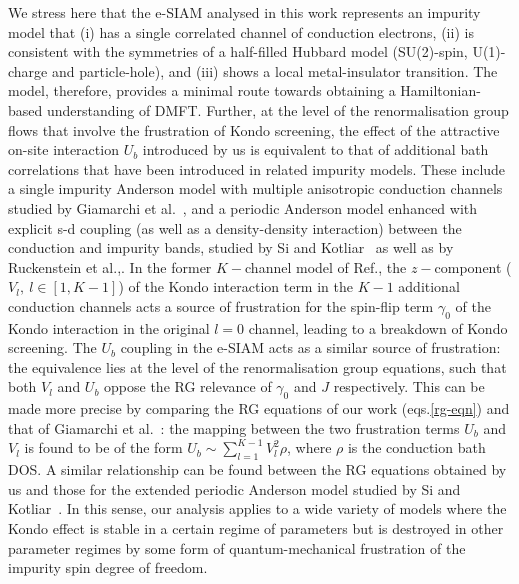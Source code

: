 We stress here that the e-SIAM analysed in this work represents an impurity model that (i) has a single correlated channel of conduction electrons, (ii) is consistent with the symmetries of a half-filled Hubbard model (SU(2)-spin, U(1)-charge and particle-hole), and (iii) shows a local metal-insulator transition. The model, therefore, provides a minimal route towards obtaining a Hamiltonian-based understanding of DMFT. Further, at the level of the renormalisation group flows that involve the frustration of Kondo screening, the effect of the attractive on-site interaction \(U_b\) introduced by us is equivalent to that of additional bath correlations that have been introduced in related impurity models. These include a single impurity Anderson model with multiple anisotropic conduction channels studied by Giamarchi et al.~\cite{giamarchi_varma_1993}, and a periodic Anderson model enhanced with explicit s-d coupling (as well as a density-density interaction) between the conduction and impurity bands, studied by Si and Kotliar~\cite{si_kotliar_1993,kotliar_1996,Si_kotliar_NFL_1993} as well as by Ruckenstein et al.,\cite{ruckenstein1991}. In the former \(K-\)channel model of Ref.\cite{giamarchi_varma_1993}, the \(z-\)component (\(V_l, ~ l\in\left[1, K-1\right] \)) of the Kondo interaction term in the \(K-1\) additional conduction channels acts a source of frustration for the spin-flip term \(\gamma_0\) of the Kondo interaction in the original \(l=0\) channel, leading to a breakdown of Kondo screening. The \(U_b\) coupling in the e-SIAM acts as a similar source of frustration: the equivalence lies at the level of the renormalisation group equations, such that both \(V_l\) and \(U_b\) oppose the RG relevance of \(\gamma_0\) and \(J\) respectively. This can be made more precise by comparing the RG equations of our work (eqs.\eqref{rg-eqn}) and that of Giamarchi et al.~\cite{giamarchi_varma_1993}: the mapping between the two frustration terms \(U_b \) and \(V_l\) is found to be of the form \(U_b \sim \sum_{l=1}^{K-1}V_l^2 \rho\), where \(\rho\) is the conduction bath DOS. A similar relationship can be found between the RG equations obtained by us and those for the extended periodic Anderson model studied by Si and Kotliar~\cite{si_kotliar_1993}. In this sense, our analysis applies to a wide variety of models where the Kondo effect is stable in a certain regime of parameters but is destroyed in other parameter regimes by some form of quantum-mechanical frustration of the impurity spin degree of freedom. 

